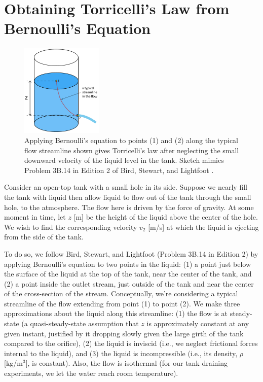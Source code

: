 \documentclass[a4paper,fleqn]{cas-sc}
\begin{document}
\clearpage

\section{Obtaining Torricelli's Law from Bernoulli's Equation}

\begin{figure}
	\centering
	\includegraphics[width=0.35\textwidth]{../drawings_and_photos/torricelli_illustration.pdf}
	\caption{Applying Bernoulli's equation to points (1) and (2) along the typical flow streamline shown gives Torricelli's law after neglecting the small downward velocity of the liquid level in the tank. Sketch mimics Problem 3B.14 in Edition 2 of Bird, Stewart, and Lightfoot \cite{bsl_book}.}
\end{figure}

	Consider an open-top tank with a small hole in its side. Suppose we nearly fill the tank with liquid then allow liquid to flow out of the tank through the small hole, to the atmosphere. The flow here is driven by the force of gravity.
	At some moment in time, let $z$ [m] be the height of the liquid above the center of the hole. 
	We wish to find the corresponding velocity $v_2$ [m/s] at which the liquid is ejecting from the side of the tank. 
	
	To do so, we follow Bird, Stewart, and Lightfoot \cite{bsl_book} (Problem 3B.14 in Edition 2) by applying Bernoulli's equation to two points in the liquid: 
	(1) a point just below the surface of the liquid at the top of the tank, near the center of the tank, and 
	(2) a point inside the outlet stream, just outside of the tank and near the center of the cross-section of the stream. 
	 Conceptually, we're considering a typical streamline of the flow extending from point (1) to point (2).
	We make three approximations about the liquid along this streamline: 
	(1) the flow is at steady-state (a quasi-steady-state assumption that $z$ is approximately constant at any given instant, justified by it dropping slowly given the large girth of the tank compared to the orifice),
	(2) the liquid is inviscid (i.e., we neglect frictional forces internal to the liquid),
	and
	(3) the liquid is incompressible (i.e., its density, $\rho$ [kg/m$^3$], is constant).
	Also, the flow is isothermal (for our tank draining experiments, we let the water reach room temperature).
	
\end{document}
